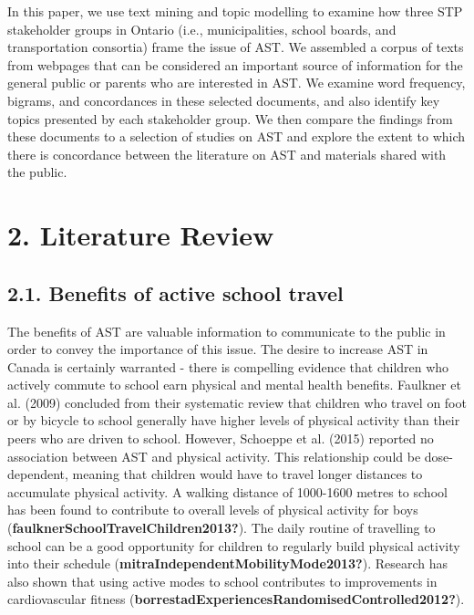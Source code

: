 \documentclass[]{elsarticle} %
\begin{document}
In this paper, we use text mining and topic modelling to examine how
three STP stakeholder groups in Ontario (i.e., municipalities, school
boards, and transportation consortia) frame the issue of AST. We
assembled a corpus of texts from webpages that can be considered an
important source of information for the general public or parents who
are interested in AST. We examine word frequency, bigrams, and
concordances in these selected documents, and also identify key topics
presented by each stakeholder group. We then compare the findings from
these documents to a selection of studies on AST and explore the extent
to which there is concordance between the literature on AST and
materials shared with the public.

\hypertarget{literature-review}{%
\section{2. Literature Review}\label{literature-review}}

\hypertarget{benefits-of-active-school-travel}{%
\subsection{2.1. Benefits of active school
travel}\label{benefits-of-active-school-travel}}

The benefits of AST are valuable information to communicate to the
public in order to convey the importance of this issue. The desire to
increase AST in Canada is certainly warranted - there is compelling
evidence that children who actively commute to school earn physical and
mental health benefits. Faulkner et al. (2009) concluded from their
systematic review that children who travel on foot or by bicycle to
school generally have higher levels of physical activity than their
peers who are driven to school. However, Schoeppe et al. (2015) reported
no association between AST and physical activity. This relationship
could be dose-dependent, meaning that children would have to travel
longer distances to accumulate physical activity. A walking distance of
1000-1600 metres to school has been found to contribute to overall
levels of physical activity for boys
(\textbf{faulknerSchoolTravelChildren2013?}). The daily routine of
travelling to school can be a good opportunity for children to regularly
build physical activity into their schedule
(\textbf{mitraIndependentMobilityMode2013?}). Research has also shown
that using active modes to school contributes to improvements in
cardiovascular fitness
(\textbf{borrestadExperiencesRandomisedControlled2012?}).
\end{document}
